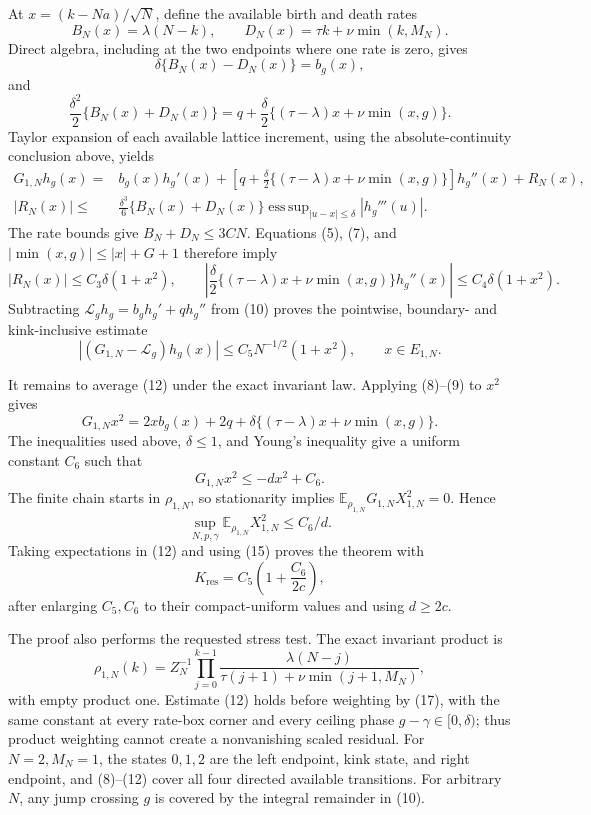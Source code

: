 At \(x=(k-Na)/\sqrt N\), define the available birth and death rates
\[
 B_N(x)=\lambda(N-k),
 \qquad D_N(x)=\tau k+\nu\min(k,M_N).
\]
Direct algebra, including at the two endpoints where one rate is zero, gives
\[
 \delta\{B_N(x)-D_N(x)\}=b_g(x),                              \tag{8}
\]
and
\[
 \frac{\delta^2}{2}\{B_N(x)+D_N(x)\}
 =q+\frac\delta2\{(\tau-\lambda)x+\nu\min(x,g)\}.            \tag{9}
\]
Taylor expansion of each available lattice increment, using the absolute-continuity conclusion above, yields
\[
 \begin{split}
 G_{1,N}h_g(x)
 ={}&b_g(x)h_g'(x)
 +\left[q+\frac\delta2\{(\tau-\lambda)x+\nu\min(x,g)\}\right]h_g''(x)
 +R_N(x),\\
 |R_N(x)|
 \leq{}&\frac{\delta^3}{6}\{B_N(x)+D_N(x)\}
 \mathop{\operatorname{ess\,sup}}_{|u-x|\leq\delta}|h_g'''(u)|.
                                                                    \tag{10}
 \end{split}
\]
The rate bounds give \(B_N+D_N\leq3CN\).  Equations (5), (7), and \(|\min(x,g)|\leq|x|+G+1\) therefore imply
\[
 |R_N(x)|\leq C_3\delta(1+x^2),
 \qquad
 \left|\frac\delta2\{(\tau-\lambda)x+\nu\min(x,g)\}h_g''(x)\right|
 \leq C_4\delta(1+x^2).                                      \tag{11}
\]
Subtracting \(\mathcal L_gh_g=b_gh_g'+qh_g''\) from (10) proves the pointwise, boundary- and kink-inclusive estimate
\[
 |(G_{1,N}-\mathcal L_g)h_g(x)|
 \leq C_5N^{-1/2}(1+x^2),
 \qquad x\in E_{1,N}.                                        \tag{12}
\]

It remains to average (12) under the exact invariant law.  Applying (8)--(9) to \(x^2\) gives
\[
 G_{1,N}x^2
 =2xb_g(x)+2q+\delta\{(\tau-\lambda)x+\nu\min(x,g)\}.      \tag{13}
\]
The inequalities used above, \(\delta\leq1\), and Young's inequality give a uniform constant \(C_6\) such that
\[
 G_{1,N}x^2\leq-dx^2+C_6.                                    \tag{14}
\]
The finite chain starts in \(\rho_{1,N}\), so stationarity implies \(\mathbb E_{\rho_{1,N}}G_{1,N}X_{1,N}^2=0\).  Hence
\[
 \sup_{N,p,\gamma}\mathbb E_{\rho_{1,N}}X_{1,N}^2\leq C_6/d. \tag{15}
\]
Taking expectations in (12) and using (15) proves the theorem with
\[
 K_{\mathrm{res}}=C_5\left(1+\frac{C_6}{2c}\right),          \tag{16}
\]
after enlarging \(C_5,C_6\) to their compact-uniform values and using \(d\geq2c\).

The proof also performs the requested stress test.  The exact invariant product is
\[
 \rho_{1,N}(k)=Z_N^{-1}\prod_{j=0}^{k-1}
 \frac{\lambda(N-j)}{\tau(j+1)+\nu\min(j+1,M_N)},             \tag{17}
\]
with empty product one.  Estimate (12) holds before weighting by (17), with the same constant at every rate-box corner and every ceiling phase \(g-\gamma\in[0,\delta)\); thus product weighting cannot create a nonvanishing scaled residual.  For \(N=2,M_N=1\), the states \(0,1,2\) are the left endpoint, kink state, and right endpoint, and (8)--(12) cover all four directed available transitions.  For arbitrary \(N\), any jump crossing \(g\) is covered by the integral remainder in (10).

